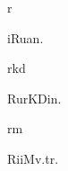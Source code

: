 \begin{multicols*}{2}
\begin{dictroot}{r}{\bigglot}
    \begin{dictentry}{iRu{\bigglot}a}{n.}
    \end{dictentry}
\end{dictroot}

\begin{dictroot}{r}{kd}
    \begin{dictentry}{RurKDi}{n.}
    \end{dictentry}
\end{dictroot}

\begin{dictroot}{r}{m}
    \begin{dictentry}{RiiM}{v.tr.}
    \end{dictentry}
\end{dictroot}


\end{multicols*}

